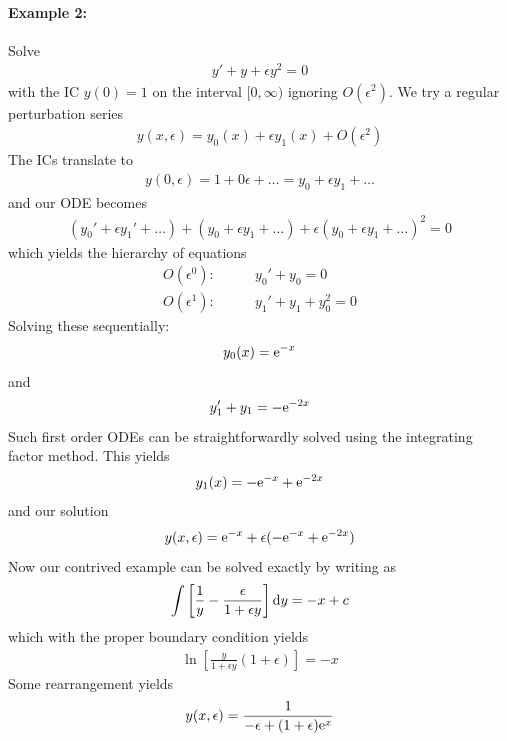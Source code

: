 \paragraph{Example 2:} Solve
\begin{gather*}
	y' + y + \epsilon y^2 = 0
\end{gather*}
with the IC $y(0)=1$ on the interval $[0,\infty)$ ignoring $O(\epsilon^2)$. We try a regular perturbation series
\begin{gather*}
	y(x,\epsilon) = y_0(x) + \epsilon y_1(x) + O(\epsilon^2)
\end{gather*}
The ICs translate to
\begin{gather*}
	y(0,\epsilon) = 1 + 0\epsilon + \dots = y_0 + \epsilon y_1 + \dots 
\end{gather*}
and our ODE becomes
\begin{gather*}
	(y_0' + \epsilon y_1' + \dots) + (y_0 + \epsilon y_1 + \dots ) + \epsilon (y_0 + \epsilon y_1 + \dots)^2 = 0
\end{gather*}
which yields the hierarchy of equations
\begin{align*}
	O(\epsilon^0): \qquad & y_0' + y_0 = 0\\
	O(\epsilon^1): \qquad & y_1' + y_1 + y_0^2 = 0 
\end{align*}
Solving these sequentially:
\begin{gather*}
	y_0(x) = \mathrm{e}^{-x}
\end{gather*}
and
\begin{gather*}
	y_1' + y_1 = -\mathrm{e}^{-2x}
\end{gather*}
Such first order ODEs can be straightforwardly solved using the integrating factor method. This yields
\begin{gather*}
	y_1(x) = -\mathrm{e}^{-x} + \mathrm{e}^{-2x}
\end{gather*}
and our solution
\begin{gather}\label{eqn:wk11-ex2-pertsoln}
	y(x,\epsilon) = \mathrm{e}^{-x} + \epsilon (-\mathrm{e}^{-x} + \mathrm{e}^{-2x})
\end{gather}
Now our contrived example can be solved exactly by writing as
\begin{gather*}
	\int \left[\frac{1}{y} - \frac{\epsilon}{1+\epsilon y}\right] \mathrm{d} y = -x + c
\end{gather*}
which with the proper boundary condition yields
\begin{gather*}
	\ln \left[\frac{y}{1+\epsilon y} (1+\epsilon)\right] = -x 
\end{gather*}
Some rearrangement yields
\begin{gather}\label{eqn:wk11-ex2-exactsoln}
	y(x,\epsilon) = \frac{1}{-\epsilon + (1+\epsilon)\mathrm{e}^x}
\end{gather}
